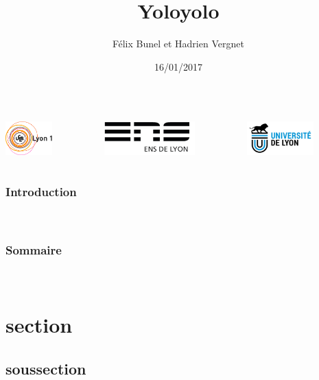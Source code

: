 \documentclass{beamer}
\title{Yolo}
\author{Félix Bunel et Hadrien Vergnet}
\date{16/01/2017}
\begin{document}

\begin{frame}[plain]

\begin{columns}
\begin{column}{3.3cm}
\center
   \includegraphics[height=1.3cm]{figures/logo_lyon1.jpg}
\end{column}
\begin{column}{3.3cm}
\center
\includegraphics[height=1.3cm]{figures/logo_ens.jpg}
\end{column}
\begin{column}{3.3cm}
\center
\includegraphics[height=1.3cm]{figures/logo_univ_lyon.jpg}
\end{column}
\end{columns}

\titlepage
\end{frame}

\title{yolo}
\begin{frame}
\frametitle{Introduction}
\framesubtitle{\ }

\end{frame}


\begin{frame}
	\frametitle{Sommaire}
	\framesubtitle{\ }
	\tableofcontents
\end{frame}

\section{section}
\subsection{soussection}
\end{document}
